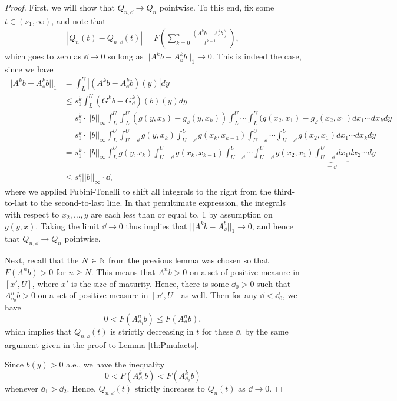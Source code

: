 \begin{proof}
	First, we will show that $Q_{n, \dd} \to Q_n$ pointwise. To this end, fix some $t \in (s_1, \infty)$, and note that
	\begin{align*}
		|Q_n(t) - Q_{n, \dd}(t)| = F \left( \sum_{k=0}^n \frac{(A^k b - A_\dd^k b)}{t^{k + 1}} \right),
	\end{align*}
	which goes to zero  as $\dd \to 0$ so long as $||A^k b - A_\dd^k b||_1 \to 0$. This is indeed the case, since we have
	\begin{align*}
		||A^k b - A_\dd^k b||_1 & = \int_L^U \left| (A^k b - A^k_\dd b)(y) \right| dy \\
		&\leq s_1^k \int_L^U (G^kb - G^k_\dd)(b)(y) dy \\
		&= s_1^k \cdot ||b||_\infty \int_L^U \int_L^U (g(y, x_k) - g_\dd(y, x_k)) \int_L^U \cdots \int_L^U (g(x_2, x_{1}) - g_\dd(x_2, x_{1}) dx_1 \cdots dx_k dy \\
		&=s_1^k \cdot ||b||_\infty \int_L^U \int_{U - \dd}^U g(y, x_k) \int_{U - \dd}^U g(x_k, x_{k - 1}) \int_{U - \dd}^U \cdots \int_{U - \dd}^U g(x_2, x_1) dx_1 \cdots dx_k dy \\
		&= s_1^k \cdot ||b||_\infty \int_L^U g(y, x_k) \int_{U - \dd}^U g(x_k, x_{k - 1}) \int_{U - \dd}^U \cdots \int_{U - \dd}^U g(x_2, x_1) \underbrace{\int_{U-\dd}^U dx_1}_{= \dd} dx_2 \cdots dy \\
		&\leq s_1^k ||b||_\infty \cdot \dd,
	\end{align*}
	where we applied Fubini-Tonelli to shift all integrals to the right from the third-to-last to the second-to-last line. In that penultimate expression, the integrals with respect to $x_2, \ldots, y$ are each less than or equal to, 1 by assumption on $g(y, x)$. Taking the limit $\dd \to 0$ thus implies that $||A^kb - A_\dd^b||_1 \to 0$, and hence that $Q_{n, \dd} \to Q_n$ pointwise.
	
	Next, recall that the $N \in \mathbb{N}$ from the previous lemma was chosen so that $F(A^n b) > 0$ for $n \geq N$. This means that $A^n b >0 $ on a set of positive measure in $[x', U]$, where $x'$ is the size of maturity. Hence, there is some $\dd_0>0$ such that $A^n_{\dd_0}b >0$ on a set of positive measure in $[x', U]$ as well. Then for any $\dd < \dd_0$, we have
	\[0 < F(A^n_{\dd_0} b) \leq F(A^n_{\dd} b),\]
	which implies that $Q_{n, \dd}(t)$ is strictly decreasing in $t$ for these $\dd$, by the same argument given in the proof to Lemma \ref{th:Pmufacts}.
	
	Since $b(y) > 0 $ a.e., we have the inequality
	\[0 < F(A_{\dd_1}^k b) < F(A_{\dd_2}^k b)\]
	whenever $\dd_1 > \dd_2$. Hence, $Q_{n, \dd}(t)$ strictly increases to $Q_n(t)$ as $\dd \to 0$.
	

\end{proof}
